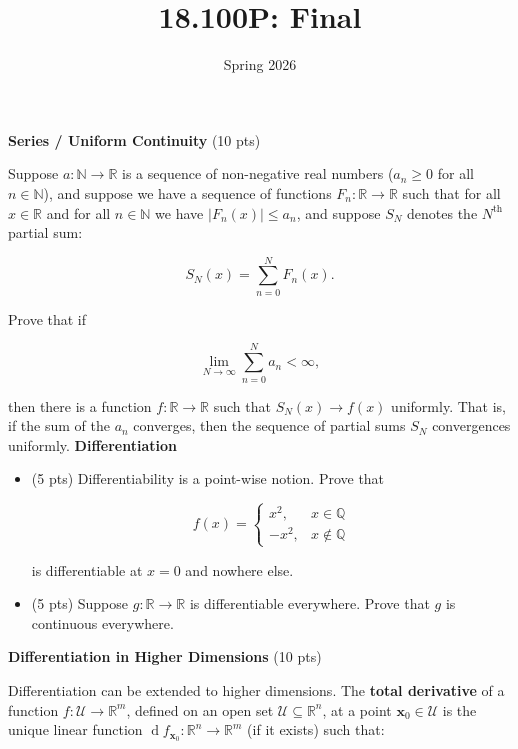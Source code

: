 \documentclass{article}
\title{18.100P: Final}
\date{Spring 2026}
\begin{document}
    \maketitle
    \textbf{Series / Uniform Continuity} (10 pts)
    \par
    Suppose $a:\mathbb{N}\rightarrow\mathbb{R}$ is a sequence of
    non-negative real numbers ($a_{n}\geq{0}$ for all $n\in\mathbb{N}$),
    and suppose we have a sequence of
    functions $F_{n}:\mathbb{R}\rightarrow\mathbb{R}$ such that for
    all $x\in\mathbb{R}$ and for all $n\in\mathbb{N}$
    we have $|F_{n}(x)|\leq{a}_{n}$, and suppose
    $S_{N}$ denotes the $N^{\textrm{th}}$ partial sum:

    \begin{equation}
        S_{N}(x)
        =
        \sum_{n=0}^{N}
            F_{n}(x).
    \end{equation}

    Prove that if

    \begin{equation}
        \lim_{N\rightarrow\infty}
        \sum_{n=0}^{N}
            a_{n}
        <
        \infty,
    \end{equation}

    then there is a function $f:\mathbb{R}\rightarrow\mathbb{R}$
    such that $S_{N}(x)\rightarrow{f}(x)$ uniformly.
    That is, if the sum of the $a_{n}$ converges, then the sequence
    of partial sums $S_{N}$ convergences uniformly.
    \newpage
    \textbf{Differentiation}
    \begin{itemize}
        \item (5 pts)
            Differentiability is a point-wise notion.
            Prove that

            \begin{equation}
                f(x)
                =
                \begin{cases}
                    x^{2},&x\in\mathbb{Q}\\
                    -x^{2},&x\not\in\mathbb{Q}
                \end{cases}
            \end{equation}

            is differentiable at $x=0$ and nowhere else.
        \item (5 pts)
            Suppose $g:\mathbb{R}\rightarrow\mathbb{R}$ is differentiable
            everywhere. Prove that $g$ is continuous everywhere.
    \end{itemize}
    \newpage
    \textbf{Differentiation in Higher Dimensions} (10 pts)
    \par
    Differentiation can be extended to higher dimensions.
    The \textbf{total derivative} of a function
    $f:\mathcal{U}\rightarrow\mathbb{R}^{m}$, defined on an open set
    $\mathcal{U}\subseteq\mathbb{R}^{n}$, at a point
    $\mathbf{x}_{0}\in\mathcal{U}$ is the unique linear function
    $%
        \operatorname{d}f_{\mathbf{x}_{0}}:%
        \mathbb{R}^{n}\rightarrow\mathbb{R}^{m}%
    $
    (if it exists) such that:
\end{document}

